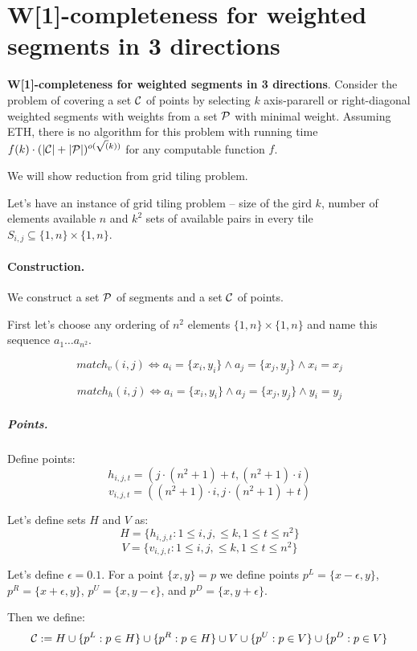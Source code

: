 \section{W[1]-completeness for weighted segments in 3 directions}

\begin{tw}
	\textbf{W[1]-completeness for weighted segments in 3 directions}.
	Consider the problem of covering a set $\mathcal{C}$ of points
	by selecting $k$ axis-pararell or right-diagonal weighted segments
	with weights
	from a set $\mathcal{P}$ with minimal weight.
	Assuming ETH, there is no algorithm for this
	problem with running time
	$f(k)\cdot(|\mathcal{C}| + |\mathcal{P}|)^{o(\sqrt(k))}$
	for any computable function $f$.
\end{tw}

We will show reduction from grid tiling problem.


Let's have an instance of grid tiling problem -- size of the
gird $k$, number of elements available $n$
and $k^2$ sets of available pairs in every tile
$S_{i, j} \subseteq \{1,n\} \times \{1,n\}$.

\paragraph{Construction.}
We construct a set $\mathcal{P}$ of segments and a set $\mathcal{C}$
of points.

First let's choose any ordering of $n^2$ elements
$\{1,n\} \times \{1,n\}$ and name this sequence $a_1 \ldots a_{n^2}$.

$$match_v(i, j) \iff
a_i = \{x_i, y_i\} \land a_j = \{x_j, y_j\} \land x_i = x_j$$

$$match_h(i, j) \iff
a_i = \{x_i, y_i\} \land a_j = \{x_j, y_j\} \land y_i = y_j$$


\subparagraph{Points.}

Define points:
	$$h_{i, j, t} = (j \cdot (n^2+1) + t, (n^2+1) \cdot i)$$
	$$v_{i, j, t} = ((n^2+1) \cdot i, j \cdot (n^2+1) + t)$$
	
Let's define sets $H$ and $V$ as:
$$H = \{h_{i, j, t} : 1 \le i, j, \le k, 1 \le t \le n^2\}$$
$$V = \{v_{i, j, t} : 1 \le i, j, \le k, 1 \le t \le n^2\}$$
	
Let's define $\epsilon = 0.1$.
For a point $\{x, y\} = p$ we define points
$p^{L} = \{x - \epsilon, y\}$,
$p^{R} = \{x + \epsilon, y\}$,
$p^{U} = \{x, y - \epsilon\}$,
and $p^{D} = \{x, y + \epsilon\}$.

Then we define:
$$\mathcal{C} := H \cup \{p^L : p \in H\} \cup \{p^R : p \in H\}
\cup V \cup \{p^U : p \in V\} \cup \{p^D : p \in V\} $$


